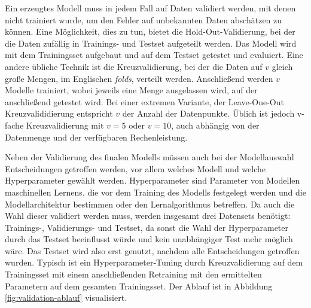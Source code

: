 	Ein erzeugtes Modell muss in jedem Fall auf Daten validiert werden, mit denen nicht trainiert wurde, um den Fehler auf unbekannten Daten abschätzen zu können. Eine Möglichkeit, dies zu tun, bietet die Hold-Out-Validierung, bei der die Daten zufällig in Trainings- und Testset aufgeteilt werden. Das Modell wird mit dem Trainingsset aufgebaut und auf dem Testset getestet und evaluiert. Eine andere übliche Technik ist die Kreuzvalidierung, bei der die Daten auf $v $ gleich große Mengen, im Englischen \textit{folds}, verteilt werden. Anschließend werden $v$ Modelle trainiert, wobei jeweils eine Menge ausgelassen wird, auf der anschließend getestet wird. Bei einer extremen Variante, der Leave-One-Out Kreuzvalididierung entspricht $v$ der Anzahl der Datenpunkte. Üblich ist jedoch v-fache Kreuzvalidierung mit $v=5$ oder $v=10$, auch abhängig von der Datenmenge und der verfügbaren Rechenleistung.
	
	Neben der Validierung des finalen Modells müssen auch bei der Modellauswahl Entscheidungen getroffen werden, vor allem welches Modell und welche Hyperparameter gewählt werden. Hyperparameter sind Parameter von Modellen maschinellen Lernens, die vor dem Training des Modells festgelegt werden und die Modellarchitektur bestimmen oder den Lernalgorithmus betreffen. Da auch die Wahl dieser validiert werden muss, werden insgesamt drei Datensets benötigt: Trainings-, Validierungs- und Testset, da sonst die Wahl der Hyperparameter durch das Testset beeinflusst würde und kein unabhängiger Test mehr möglich wäre. Das Testset wird also erst genutzt, nachdem alle Entscheidungen getroffen wurden. Typisch ist ein Hyperparameter-Tuning durch Kreuzvalidierung auf dem Trainingsset mit einem anschließenden Retraining mit den ermittelten Parametern auf dem gesamten Trainingsset. Der Ablauf ist in Abbildung \ref{fig:validation-ablauf} visualisiert.
	
